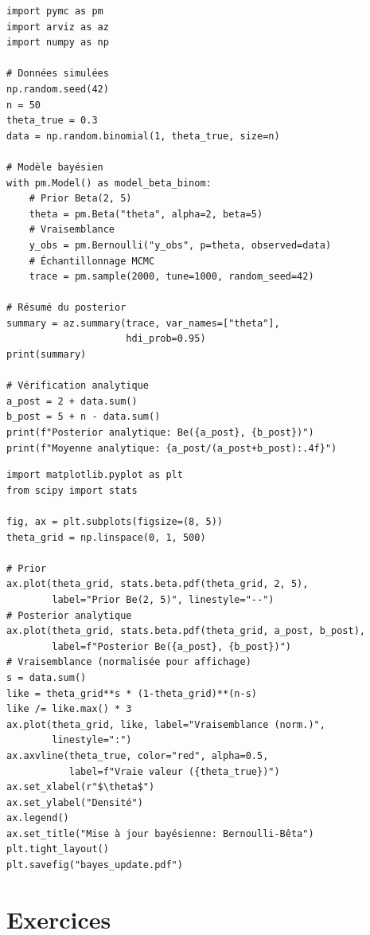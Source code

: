 \begin{codeblock}[title=\textbf{Mod\`ele Bernoulli--B\^eta avec PyMC}]
\begin{verbatim}
import pymc as pm
import arviz as az
import numpy as np

# Données simulées
np.random.seed(42)
n = 50
theta_true = 0.3
data = np.random.binomial(1, theta_true, size=n)

# Modèle bayésien
with pm.Model() as model_beta_binom:
    # Prior Beta(2, 5)
    theta = pm.Beta("theta", alpha=2, beta=5)
    # Vraisemblance
    y_obs = pm.Bernoulli("y_obs", p=theta, observed=data)
    # Échantillonnage MCMC
    trace = pm.sample(2000, tune=1000, random_seed=42)

# Résumé du posterior
summary = az.summary(trace, var_names=["theta"],
                     hdi_prob=0.95)
print(summary)

# Vérification analytique
a_post = 2 + data.sum()
b_post = 5 + n - data.sum()
print(f"Posterior analytique: Be({a_post}, {b_post})")
print(f"Moyenne analytique: {a_post/(a_post+b_post):.4f}")
\end{verbatim}
\end{codeblock}

\begin{codeblock}[title=\textbf{Visualisation prior--posterior}]
\begin{verbatim}
import matplotlib.pyplot as plt
from scipy import stats

fig, ax = plt.subplots(figsize=(8, 5))
theta_grid = np.linspace(0, 1, 500)

# Prior
ax.plot(theta_grid, stats.beta.pdf(theta_grid, 2, 5),
        label="Prior Be(2, 5)", linestyle="--")
# Posterior analytique
ax.plot(theta_grid, stats.beta.pdf(theta_grid, a_post, b_post),
        label=f"Posterior Be({a_post}, {b_post})")
# Vraisemblance (normalisée pour affichage)
s = data.sum()
like = theta_grid**s * (1-theta_grid)**(n-s)
like /= like.max() * 3
ax.plot(theta_grid, like, label="Vraisemblance (norm.)",
        linestyle=":")
ax.axvline(theta_true, color="red", alpha=0.5,
           label=f"Vraie valeur ({theta_true})")
ax.set_xlabel(r"$\theta$")
ax.set_ylabel("Densité")
ax.legend()
ax.set_title("Mise à jour bayésienne: Bernoulli-Bêta")
plt.tight_layout()
plt.savefig("bayes_update.pdf")
\end{verbatim}
\end{codeblock}

\section{Exercices}

